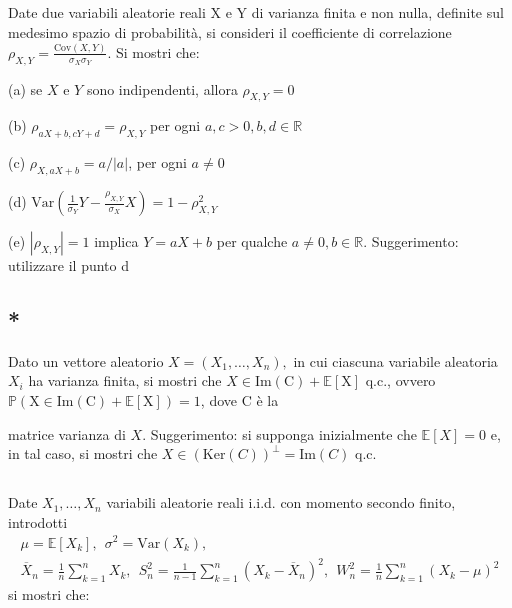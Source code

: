 

\subsection{}

Date due variabili aleatorie reali X e Y di varianza finita e non nulla, definite sul medesimo spazio di probabilità, si consideri il coefficiente di correlazione $\rho _{X,Y} =\frac{\mathrm{Cov} (X,Y)}{\sigma _{X} \sigma _{Y}}$. Si mostri che:

(a) se $X$ e $Y$ sono indipendenti, allora $\rho _{X,Y} =0$

(b) $\rho _{aX+b,cY+d} =\rho _{X,Y}$ per ogni $a,c >0,b,d\in \mathbb{R}$

(c) $\rho _{X,aX+b} =a/|a|$, per ogni $a\neq 0$

(d) $\mathrm{Var}\left(\frac{1}{\sigma _{Y}} Y-\frac{\rho _{X,Y}}{\sigma _{X}} X\right) =1-\rho _{X,Y}^{2}$

(e) $| \rho _{X,Y}| =1$ implica $Y=aX+b$ per qualche $a\neq 0,b\in \mathbb{R}$. Suggerimento: utilizzare il punto d
\subsection{* }

Dato un vettore aleatorio $X=( X_{1} ,\dotsc ,X_{n}) ,$ in cui ciascuna variabile aleatoria $X_{i}$ ha varianza finita, si mostri che $X\in \mathrm{Im} (\mathrm{C} )+\mathbb{E} [\mathrm{X} ]$ q.c., ovvero $\mathbb{P} (\mathrm{X} \in \mathrm{Im} (\mathrm{C} )+\mathbb{E} [\mathrm{X} ])=1$, dove $\mathrm{C}$ è la

matrice varianza di $X$. Suggerimento: si supponga inizialmente che $\mathbb{E} [X]=0$ e, in tal caso, si mostri che $X\in (\mathrm{Ker} (C))^{\perp } =\mathrm{Im} (C)$ q.c.
\subsection{}

Date $X_{1} ,\dotsc ,X_{n}$ variabili aleatorie reali i.i.d. con momento secondo finito, introdotti
\begin{gather*}
\mu =\mathbb{E}[ X_{k}] ,\ \ \sigma ^{2} =\mathrm{Var}( X_{k}) ,\\
\overline{X}_{n} =\frac{1}{n}\sum _{k=1}^{n} X_{k} ,\ \ S_{n}^{2} =\frac{1}{n-1}\sum _{k=1}^{n}( X_{k} -\overline{X}_{n})^{2} ,\ \ W_{n}^{2} =\frac{1}{n}\sum _{k=1}^{n}( X_{k} -\mu )^{2}
\end{gather*}
si mostri che:

